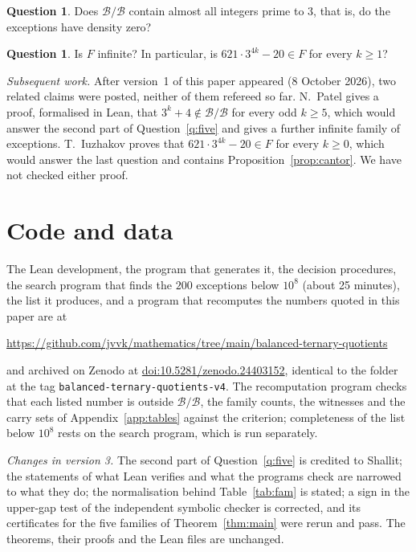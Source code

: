 \documentclass[11pt]{amsart}
\theoremstyle{definition}
\newtheorem{question}[theorem]{Question}
\newcommand{\B}{\mathcal{B}}
\begin{document}
\begin{question}
Does $\B/\B$ contain almost all integers prime to $3$, that is, do the exceptions have density zero?
\end{question}

\begin{question}
Is $F$ infinite? In particular, is $621\cdot 3^{4k}-20\in F$ for every $k\ge 1$?
\end{question}

\emph{Subsequent work.} After version~1 of this paper appeared (8 October 2026), two related claims were
posted, neither of them refereed so far. N.~Patel \cite{Patel} gives a proof, formalised in Lean, that
$3^k+4\notin\B/\B$ for every odd $k\ge 5$, which would answer the second part of Question~\ref{q:five} and
gives a further infinite family of exceptions. T.~Iuzhakov \cite{Iuz} proves that $621\cdot 3^{4k}-20\in F$
for every $k\ge 0$, which would answer the last question and contains Proposition~\ref{prop:cantor}. We
have not checked either proof.

\section*{Code and data}
The Lean development, the program that generates it, the decision procedures, the search program that finds the $200$
exceptions below $10^8$ (about 25 minutes), the list it produces, and a program that recomputes the numbers quoted
in this paper are at
\begin{center}\small\url{https://github.com/jvvk/mathematics/tree/main/balanced-ternary-quotients}\end{center}
and archived on Zenodo at \href{https://doi.org/10.5281/zenodo.24403152}{doi:10.5281/zenodo.24403152},
identical to the folder at the tag \texttt{balanced-ternary-\allowbreak quotients-v4}.
The recomputation program checks that each listed number is outside $\B/\B$, the family counts, the witnesses
and the carry sets of Appendix~\ref{app:tables} against the criterion; completeness of the list below $10^8$ rests
on the search program, which is run separately.

\emph{Changes in version 3.} The second part of Question~\ref{q:five} is credited to Shallit; the statements of what Lean
verifies and what the programs check are narrowed to what they do; the normalisation behind Table~\ref{tab:fam} is
stated; a sign in the upper-gap test of the independent symbolic checker is corrected, and its certificates for
the five families of Theorem~\ref{thm:main} were rerun and pass. The theorems, their proofs and the Lean files are
unchanged.
\end{document}
